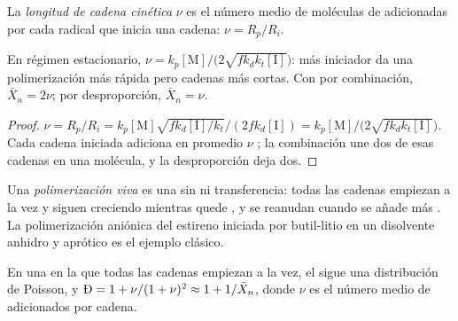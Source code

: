 \begin{definition}\label{def:b2:polymer-synthesis:chain-length}
La \emph{longitud de cadena cinética} $\nu$ es el número medio de moléculas de 
adicionadas por cada radical que inicia una cadena: $\nu = R_p/R_i$.
\end{definition}

\begin{proposition}\label{prop:b2:polymer-synthesis:chain-length}
En régimen estacionario, $\nu = k_p[\mathrm M]/\bigl(2\sqrt{fk_dk_t[\mathrm I]}\bigr)$: más iniciador da una
polimerización más rápida pero cadenas más cortas. Con  por combinación, $\bar X_n = 2\nu$; por
desproporción, $\bar X_n = \nu$.
\end{proposition}

\begin{proof}
$\nu = R_p/R_i = k_p[\mathrm M]\sqrt{fk_d[\mathrm I]/k_t}/(2fk_d[\mathrm I]) =
k_p[\mathrm M]/\bigl(2\sqrt{fk_dk_t[\mathrm I]}\bigr)$. Cada cadena iniciada adiciona en promedio $\nu$ ;
la combinación une dos de esas cadenas en una molécula, y la desproporción deja dos.
\end{proof}

\begin{definition}\label{def:b2:polymer-synthesis:living}
Una \emph{polimerización viva} es una  sin
 ni transferencia: todas las cadenas empiezan a la vez y siguen creciendo mientras quede , y
se reanudan cuando se añade más . La polimerización aniónica del estireno iniciada por
butil-litio en un disolvente anhidro y aprótico es el ejemplo clásico.
\end{definition}

\begin{proposition}\label{prop:b2:polymer-synthesis:living}
En una  en la que todas las cadenas empiezan a la vez, el  sigue una
distribución de Poisson, y $\text{\DH} = 1 + \nu/(1+\nu)^2 \approx 1 + 1/\bar X_n$, donde $\nu$ es el
número medio de  adicionados por cadena.
\end{proposition}

